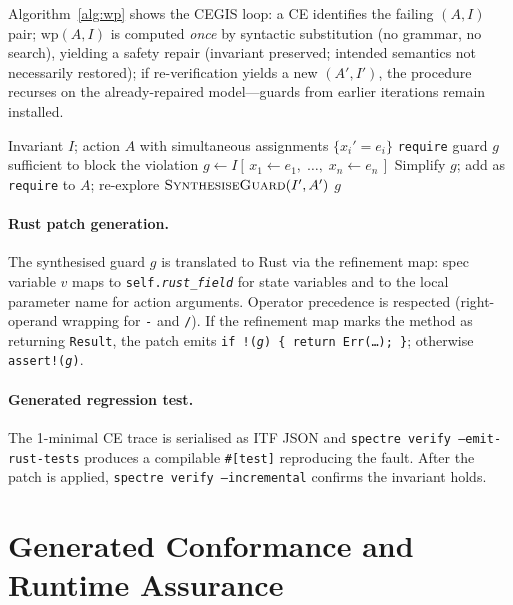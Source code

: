 \documentclass[runningheads]{../paper-vmcai-2027/llncs}
\begin{document}
Algorithm~\ref{alg:wp} shows the CEGIS loop: a CE identifies the failing
$(A,I)$ pair; $\mathrm{wp}(A,I)$ is computed \emph{once} by syntactic substitution
(no grammar, no search), yielding a safety repair (invariant preserved; intended
semantics not necessarily restored); if re-verification yields a new $(A',I')$,
the procedure recurses on the already-repaired model---guards from earlier
iterations remain installed.

\begin{algorithm}[t]
\caption{$\textsc{SynthesiseGuard}(I,\,A)$}\label{alg:wp}
\begin{algorithmic}[1]
\Require Invariant $I$; action $A$ with simultaneous assignments $\{x_i'=e_i\}$
\Ensure \texttt{require} guard $g$ sufficient to block the violation
\State $g\leftarrow I[\,x_1\leftarrow e_1,\;\ldots,\;x_n\leftarrow e_n\,]$
\State Simplify $g$; add as \texttt{require} to $A$; re-explore
  \Return $\textsc{SynthesiseGuard}(I',A')$
\EndIf
\State \Return $g$
\end{algorithmic}
\end{algorithm}

\paragraph{Rust patch generation.}
The synthesised guard $g$ is translated to Rust via the refinement map:
spec variable $v$ maps to \texttt{self.\emph{rust\_field}} for state variables
and to the local parameter name for action arguments.
Operator precedence is respected (right-operand wrapping for \texttt{-} and
\texttt{/}).
If the refinement map marks the method as returning \texttt{Result}, the patch
emits \texttt{if !(\emph{g}) \{ return Err(\ldots); \}};
otherwise \texttt{assert!(\emph{g})}.

\paragraph{Generated regression test.}
The 1-minimal CE trace is serialised as ITF JSON and
\texttt{spectre verify --emit-rust-tests} produces a compilable
\texttt{\#[test]} reproducing the fault.
After the patch is applied, \texttt{spectre verify --incremental}
confirms the invariant holds.

\section{Generated Conformance and Runtime Assurance}\label{sec:conformance}
\end{document}
